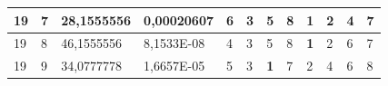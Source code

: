 \documentclass[conference]{IEEEtran}
\begin{document}
\begin{table}[]
\begin{tabular}{|llll|llllllll|}
\multicolumn{1}{|l|}{19}                                                    & \multicolumn{1}{l|}{7}                                                        & \multicolumn{1}{l|}{28,1555556}                                                   & 0,00020607                     & \multicolumn{1}{l|}{6}                                                  & \multicolumn{1}{l|}{3}                                                  & \multicolumn{1}{l|}{5}                                                  & \multicolumn{1}{l|}{8}                                                  & \multicolumn{1}{l|}{\textbf{1}}                                         & \multicolumn{1}{l|}{2}                                                  & \multicolumn{1}{l|}{4}                                                  & 7                          \\ \hline
\multicolumn{1}{|l|}{19}                                                    & \multicolumn{1}{l|}{8}                                                        & \multicolumn{1}{l|}{46,1555556}                                                   & 8,1533E-08                     & \multicolumn{1}{l|}{4}                                                  & \multicolumn{1}{l|}{3}                                                  & \multicolumn{1}{l|}{5}                                                  & \multicolumn{1}{l|}{8}                                                  & \multicolumn{1}{l|}{\textbf{1}}                                         & \multicolumn{1}{l|}{2}                                                  & \multicolumn{1}{l|}{6}                                                  & 7                          \\ \hline
\multicolumn{1}{|l|}{19}                                                    & \multicolumn{1}{l|}{9}                                                        & \multicolumn{1}{l|}{34,0777778}                                                   & 1,6657E-05                     & \multicolumn{1}{l|}{5}                                                  & \multicolumn{1}{l|}{3}                                                  & \multicolumn{1}{l|}{\textbf{1}}                                         & \multicolumn{1}{l|}{7}                                                  & \multicolumn{1}{l|}{2}                                                  & \multicolumn{1}{l|}{4}                                                  & \multicolumn{1}{l|}{6}                                                  & 8                          \\ \hline

\end{tabular}
\end{table}
\end{document}
